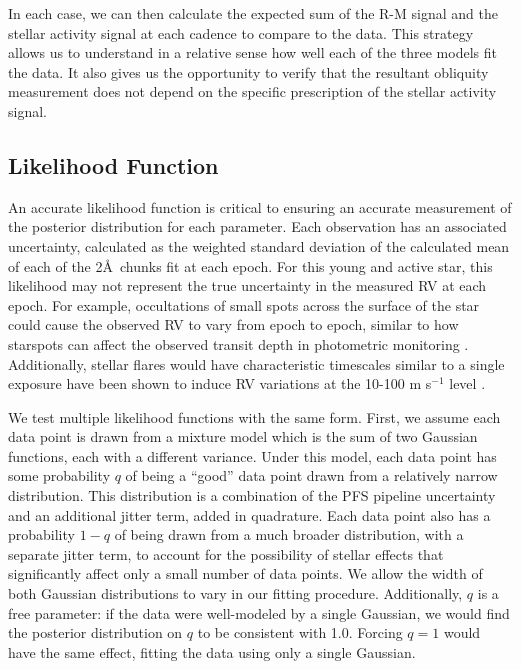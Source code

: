\documentclass[twocolumn]{aastex63}
\begin{document}
In each case, we can then calculate the expected sum of the R-M signal and the stellar activity signal at each cadence to compare to the data. 
This strategy allows us to understand in a relative sense how well each of the three models fit the data. 
It also gives us the opportunity to verify that the resultant obliquity measurement does not depend on the specific prescription of the stellar activity signal.




\subsection{Likelihood Function}

An accurate likelihood function is critical to ensuring an accurate measurement of the posterior distribution for each parameter.
Each observation has an associated uncertainty, calculated as the weighted standard deviation of the calculated mean of each of the 2\AA\ chunks fit at each epoch.
For this young and active star, this likelihood may not represent the true uncertainty in the measured RV at each epoch. 
For example, occultations of small spots across the surface of the star could cause the observed RV to vary from epoch to epoch, similar to how starspots can affect the observed transit depth in photometric monitoring \citep{SanchisOjeda13}.
Additionally, stellar flares would have characteristic timescales similar to a single exposure have been shown to induce RV variations at the 10-100 m s$^{-1}$ level \citep{Reiners09}.

We test multiple likelihood functions with the same form.
First, we assume each data point is drawn from a mixture model which is the sum of two Gaussian functions, each with a different variance.
Under this model, each data point has some probability $q$ of being a ``good'' data point drawn from a relatively narrow distribution. This distribution is a combination of the PFS pipeline uncertainty and an additional jitter term, added in quadrature. 
Each data point also has a probability $1-q$ of being drawn from a much broader distribution, with a separate jitter term, to account for the possibility of stellar effects that significantly affect only a small number of data points. We allow the width of both Gaussian distributions to vary in our fitting procedure. 
Additionally, $q$ is a free parameter: if the data were well-modeled by a single Gaussian, we would find the posterior distribution on $q$ to be consistent with 1.0.
Forcing $q=1$ would have the same effect, fitting the data using only a single Gaussian.
\end{document}
